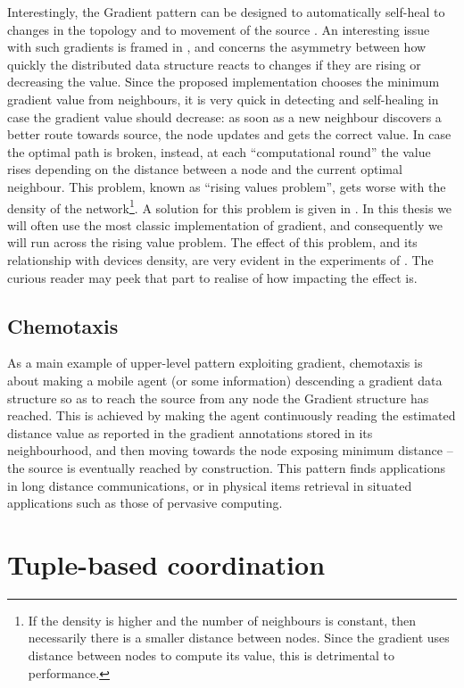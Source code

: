 \documentclass[12pt,a4paper,twoside,openright]{book}
\begin{document}
Interestingly, the Gradient pattern can be designed to automatically self-heal to changes in the topology and to movement of the source \cite{flexiblegradients}.
%
An interesting issue with such gradients is framed in \cite{crf}, and concerns the asymmetry between how quickly the distributed data structure reacts to changes if they are rising or decreasing the value.
%
Since the proposed implementation chooses the minimum gradient value from neighbours, it is very quick in detecting and self-healing in case the gradient value should decrease: as soon as a new neighbour discovers a better route towards source, the node updates and gets the correct value.
%
In case the optimal path is broken, instead, at each ``computational round'' the value rises depending on the distance between a node and the current optimal neighbour.
%
This problem, known as ``rising values problem'', gets worse with the density of the network\footnote{If the density is higher and the number of neighbours is constant, then necessarily there is a smaller distance between nodes. Since the gradient uses distance between nodes to compute its value, this is detrimental to performance.}.
%
A solution for this problem is given in \cite{crf}.
%
In this thesis we will often use the most classic implementation of gradient, and consequently we will run across the rising value problem.
%
The effect of this problem, and its relationship with devices density, are very evident in the experiments of .
%
The curious reader may peek that part to realise of how impacting the effect is.

\subsection{Chemotaxis}

As a main example of upper-level pattern exploiting gradient, chemotaxis is about making a mobile agent (or some information) descending a gradient data structure so as to reach the source from any node the Gradient structure has reached.
%
This is achieved by making the agent continuously reading the estimated distance value as reported in the gradient annotations stored in its neighbourhood, and then moving towards the node exposing minimum distance -- the source is eventually reached by construction.
%
This pattern finds applications in long distance communications, or in physical items retrieval in situated applications such as those of pervasive computing.

\section{Tuple-based coordination}
\end{document}
